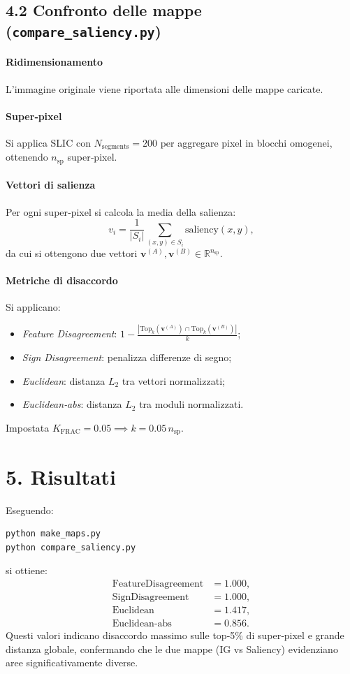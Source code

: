 \documentclass[a4paper,11pt]{article}
\begin{document}
\subsection*{4.2 Confronto delle mappe (\texttt{compare\_saliency.py})}
\paragraph{Ridimensionamento}
L’immagine originale viene riportata alle dimensioni delle mappe caricate.

\paragraph{Super‐pixel}
Si applica SLIC con $N_{\text{segments}}=200$ per aggregare pixel in blocchi omogenei, ottenendo $n_{\text{sp}}$ super‐pixel.

\paragraph{Vettori di salienza}
Per ogni super‐pixel si calcola la media della salienza:
\[
v_i = \frac{1}{|S_i|} \sum_{(x,y)\in S_i} \text{saliency}(x,y),
\]
da cui si ottengono due vettori $\mathbf v^{(A)}, \mathbf v^{(B)}\in\mathbb R^{n_{\text{sp}}}$.

\paragraph{Metriche di disaccordo}
Si applicano:
\begin{itemize}
  \item \emph{Feature Disagreement}: $1 - \frac{|\mathrm{Top}_k(\mathbf v^{(A)})\cap\mathrm{Top}_k(\mathbf v^{(B)})|}{k}$;
  \item \emph{Sign Disagreement}: penalizza differenze di segno;
  \item \emph{Euclidean}: distanza $L_2$ tra vettori normalizzati;
  \item \emph{Euclidean‐abs}: distanza $L_2$ tra moduli normalizzati.
\end{itemize}
Impostata $K_{\text{FRAC}}=0.05 \implies k=0.05\,n_{\text{sp}}$.

\section*{5. Risultati}
Eseguendo:
\begin{verbatim}
python make_maps.py
python compare_saliency.py
\end{verbatim}
si ottiene:
\[
\begin{aligned}
\text{FeatureDisagreement} &= 1.000,\\ 
\text{SignDisagreement}    &= 1.000,\\
\text{Euclidean}           &= 1.417,\\
\text{Euclidean-abs}       &= 0.856.
\end{aligned}
\]
Questi valori indicano disaccordo massimo sulle top‐5\% di super‐pixel e grande distanza globale, confermando che le due mappe (IG vs Saliency) evidenziano aree significativamente diverse.
\end{document}
